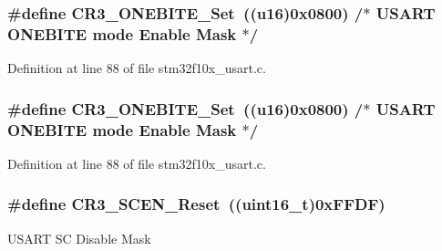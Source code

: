 \subsubsection[{\texorpdfstring{C\+R3\+\_\+\+O\+N\+E\+B\+I\+T\+E\+\_\+\+Set}{CR3_ONEBITE_Set}}]{\setlength{\rightskip}{0pt plus 5cm}\#define C\+R3\+\_\+\+O\+N\+E\+B\+I\+T\+E\+\_\+\+Set~(({\bf u16})0x0800)  /$\ast$ U\+S\+A\+R\+T O\+N\+E\+B\+I\+T\+E mode Enable Mask $\ast$/}\hypertarget{group___u_s_a_r_t___private___defines_gac512024dda541435acfe0b50de925105}{}\label{group___u_s_a_r_t___private___defines_gac512024dda541435acfe0b50de925105}


Definition at line 88 of file stm32f10x\+\_\+usart.\+c.

\subsubsection[{\texorpdfstring{C\+R3\+\_\+\+O\+N\+E\+B\+I\+T\+E\+\_\+\+Set}{CR3_ONEBITE_Set}}]{\setlength{\rightskip}{0pt plus 5cm}\#define C\+R3\+\_\+\+O\+N\+E\+B\+I\+T\+E\+\_\+\+Set~(({\bf u16})0x0800)  /$\ast$ U\+S\+A\+R\+T O\+N\+E\+B\+I\+T\+E mode Enable Mask $\ast$/}\hypertarget{group___u_s_a_r_t___private___defines_gac512024dda541435acfe0b50de925105}{}\label{group___u_s_a_r_t___private___defines_gac512024dda541435acfe0b50de925105}


Definition at line 88 of file stm32f10x\+\_\+usart.\+c.

\subsubsection[{\texorpdfstring{C\+R3\+\_\+\+S\+C\+E\+N\+\_\+\+Reset}{CR3_SCEN_Reset}}]{\setlength{\rightskip}{0pt plus 5cm}\#define C\+R3\+\_\+\+S\+C\+E\+N\+\_\+\+Reset~(({\bf uint16\+\_\+t})0x\+F\+F\+D\+F)}\hypertarget{group___u_s_a_r_t___private___defines_ga294c473dc7f8ff3e9cbaa0675c8c75f3}{}\label{group___u_s_a_r_t___private___defines_ga294c473dc7f8ff3e9cbaa0675c8c75f3}
U\+S\+A\+RT SC Disable Mask 

